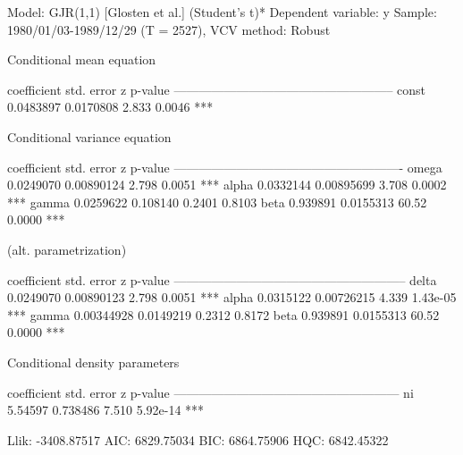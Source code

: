 \documentclass[a4paper,11pt]{article}
\begin{document}
\begin{code}
Model: GJR(1,1) [Glosten et al.] (Student's t)*
Dependent variable: y
Sample: 1980/01/03-1989/12/29 (T = 2527), VCV method: Robust

    Conditional mean equation

             coefficient   std. error     z     p-value
  -----------------------------------------------------
  const       0.0483897    0.0170808    2.833   0.0046  ***

    Conditional variance equation

             coefficient   std. error      z      p-value
  -------------------------------------------------------
  omega       0.0249070    0.00890124    2.798    0.0051  ***
  alpha       0.0332144    0.00895699    3.708    0.0002  ***
  gamma       0.0259622    0.108140      0.2401   0.8103 
  beta        0.939891     0.0155313    60.52     0.0000  ***

   (alt. parametrization)

             coefficient   std. error      z      p-value 
  --------------------------------------------------------
  delta      0.0249070     0.00890123    2.798    0.0051   ***
  alpha      0.0315122     0.00726215    4.339    1.43e-05 ***
  gamma      0.00344928    0.0149219     0.2312   0.8172  
  beta       0.939891      0.0155313    60.52     0.0000   ***

    Conditional density parameters

             coefficient   std. error     z     p-value 
  ------------------------------------------------------
  ni           5.54597      0.738486    7.510   5.92e-14 ***

	Llik:  -3408.87517	 AIC:   6829.75034
	BIC:    6864.75906	 HQC:   6842.45322
\end{code}
\end{document}
